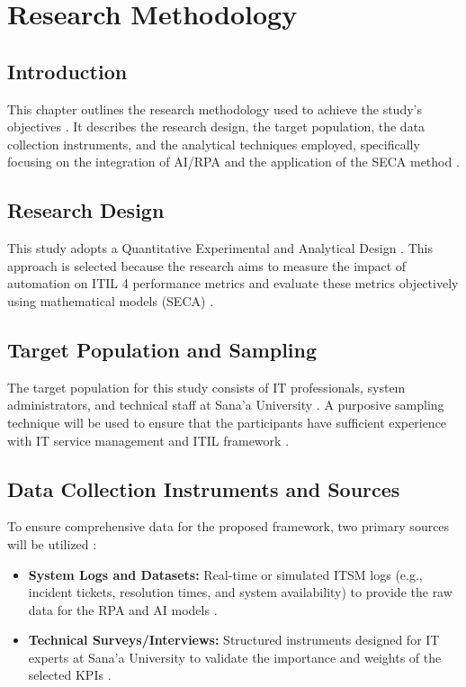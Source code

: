 \documentclass[12pt,a4paper,oneside]{report}
\begin{document}
\chapter{Research Methodology}

\section{Introduction}
This chapter outlines the research methodology used to achieve the study’s objectives \cite{almontaser2025}. It describes the research design, the target population, the data collection instruments, and the analytical techniques employed, specifically focusing on the integration of AI/RPA and the application of the SECA method \cite{almontaser2025}.

\section{Research Design}
This study adopts a Quantitative Experimental and Analytical Design \cite{almontaser2025}. This approach is selected because the research aims to measure the impact of automation on ITIL 4 performance metrics and evaluate these metrics objectively using mathematical models (SECA) \cite{almontaser2025}.

\section{Target Population and Sampling}
The target population for this study consists of IT professionals, system administrators, and technical staff at Sana'a University \cite{almontaser2025}. A purposive sampling technique will be used to ensure that the participants have sufficient experience with IT service management and ITIL framework \cite{almontaser2025}.

\section{Data Collection Instruments and Sources}
To ensure comprehensive data for the proposed framework, two primary sources will be utilized \cite{almontaser2025}:
\begin{itemize}
    \item \textbf{System Logs and Datasets:} Real-time or simulated ITSM logs (e.g., incident tickets, resolution times, and system availability) to provide the raw data for the RPA and AI models \cite{almontaser2025}.
    \item \textbf{Technical Surveys/Interviews:} Structured instruments designed for IT experts at Sana'a University to validate the importance and weights of the selected KPIs \cite{almontaser2025}.
\end{itemize}
\end{document}
